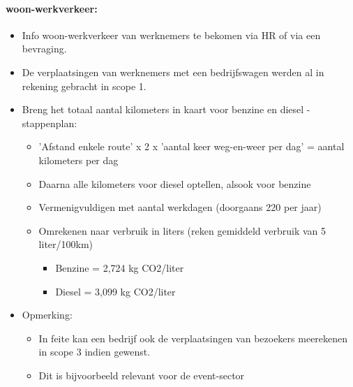 \documentclass[12pt]{article}
\begin{document}
\paragraph{woon-werkverkeer:}
\begin{itemize}
    \item Info woon-werkverkeer van werknemers te bekomen via HR of via een bevraging.
    \item De verplaatsingen van werknemers met een bedrijfswagen werden al in rekening
    gebracht in scope 1.
    \item Breng het totaal aantal kilometers in kaart voor benzine en diesel - stappenplan:\begin{itemize}
        \item 'Afstand enkele route' x 2 x 'aantal keer weg-en-weer per dag' = aantal kilometers
        per dag 
        \item Daarna alle kilometers voor diesel optellen, alsook voor benzine
        \item Vermenigvuldigen met aantal werkdagen (doorgaans 220 per jaar)
        \item Omrekenen naar verbruik in liters (reken gemiddeld verbruik van 5 liter/100km)\begin{itemize}
            \item Benzine = 2,724 kg CO2/liter
            \item Diesel = 3,099 kg CO2/liter
        \end{itemize}
    \end{itemize}  
    \item Opmerking:\begin{itemize}
        \item In feite kan een bedrijf ook de verplaatsingen van bezoekers meerekenen in scope 3
        indien gewenst. 
        \item Dit is bijvoorbeeld relevant voor de event-sector
    \end{itemize}
\end{itemize}
\end{document}
